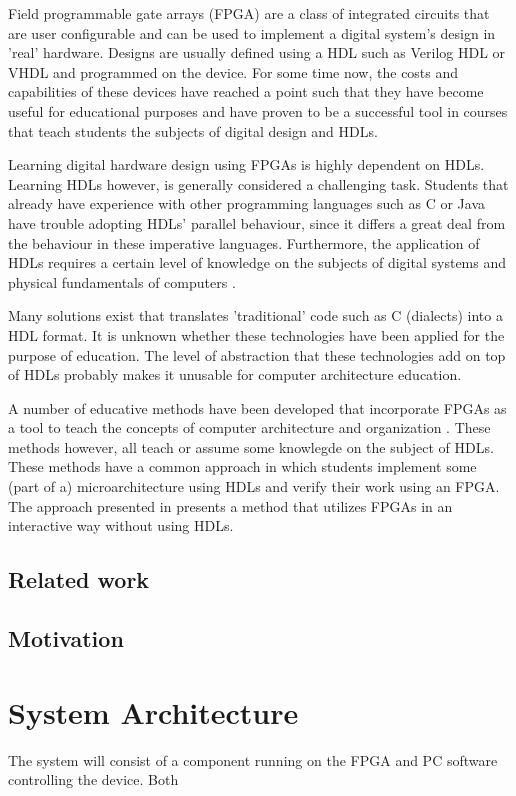 \documentclass[singleside,openright]{uva-bachelor-thesis}
\begin{document}
Field programmable gate arrays (FPGA) are a class of integrated circuits that are user configurable and can be used to implement a digital system's design in 'real' hardware. Designs are usually defined using a HDL such as Verilog HDL or VHDL and programmed on the device. For some time now, the costs and capabilities of these devices have reached a point such that they have become useful for educational purposes and have proven to be a successful tool in courses that teach students the subjects of digital design and HDLs. 

Learning digital hardware design using FPGAs is highly dependent on HDLs. Learning HDLs however, is generally considered a challenging task. Students that already have experience with other programming languages such as C or Java have trouble adopting HDLs' parallel behaviour, since it differs a great deal from the behaviour in these imperative languages. Furthermore, the application of HDLs requires a certain level of knowledge on the subjects of digital systems and physical fundamentals of computers \cite[p.2]{nativeFPGA}. 

Many solutions exist that translates 'traditional' code such as C (dialects) into a HDL format. It is unknown whether these technologies have been applied for the purpose of education. The level of abstraction that these technologies add on top of HDLs probably makes it unusable for computer architecture education.

A number of educative methods have been developed that incorporate FPGAs as a tool to teach the concepts of computer architecture and organization \cite{nativeFPGA, jansen2014every, nakano2008processor, el2011teaching}. These methods however, all teach or assume some knowlegde on the subject of HDLs. These methods have a common approach in which students implement some (part of a) microarchitecture using HDLs and verify their work using an FPGA. The approach presented in \cite{holland2003harnessing} presents a method that utilizes FPGAs in an interactive way without using HDLs. 


\section{Related work}
\section{Motivation}

\chapter{System Architecture}
The system will consist of a component running on the FPGA and PC software controlling the device. Both 
\end{document}
